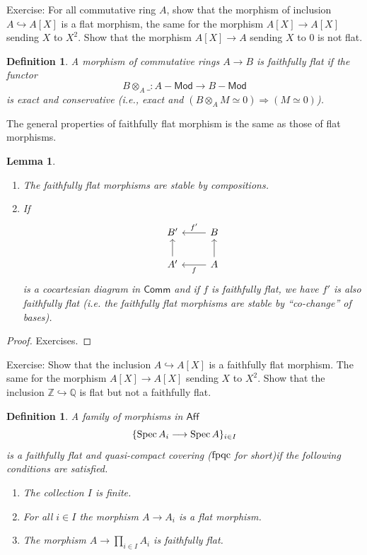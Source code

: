 \documentclass{tufte-book} %
\numberwithin{dummy}{section}
\newtheorem{lemma}[thm]{Lemma}
\newtheorem{dfn}[thm]{Definition}
\newcommand{\spec}{\textnormal{Spec}\,}
\newcommand{\intg}{\mathbb Z}
\newcommand{\ratl}{\mathbb Q}
\newcommand{\Lrta}{\Longrightarrow}
\newcommand{\lrta}{\longrightarrow}
\newcommand{\inj}{\hookrightarrow}
\begin{document}
Exercise: For all commutative ring $A$, show that the morphism of inclusion $A\inj A[X]$ is a flat morphism, the same for the morphism $A[X]\lrta A[X]$ sending $X$ to $X^2$. Show that the morphism $A[X]\lrta A$ sending $X$ to $0$ is not flat.
\begin{dfn}
A morphism of commutative rings $A\lrta B$ is faithfully flat if the functor 
$$B\otimes_A\_: A-\mathsf{Mod}\lrta B-\mathsf{Mod}
$$
is exact and conservative (i.e., exact and $(B\otimes_A M\simeq 0)\Lrta (M\simeq 0)$).
\end{dfn}
The general properties of faithfully flat  morphism is the same as those of flat morphisms.
\begin{lemma}\label{lem:property_faithfully_flat}
\ \begin{enumerate}
\item The faithfully flat morphisms are stable by compositions.
\item  If
$$
\begin{tikzcd}
B' & B \arrow[l, "f'"'] \\
A' \arrow[u] & A \arrow[l, "f"] \arrow[u]
\end{tikzcd}
$$ 
is a cocartesian diagram in $\mathsf{Comm}$ and if $f$ is faithfully flat, we have $f'$ is also faithfully flat (i.e. the faithfully flat morphisms are stable by ``co-change'' of bases).
\end{enumerate}
\end{lemma}
\begin{proof}
Exercises.
\end{proof}

Exercise: Show that the inclusion $A\inj A[X]$ is a faithfully flat morphism. The same for the morphism $A[X]\lrta A[X]$ sending $X$ to $X^2$. Show that the inclusion $\intg\inj \ratl$ is flat but not a faithfully flat.

\begin{dfn}
A family of morphisms in $\mathsf{Aff}$
$$
\{\spec A_i\lrta \spec A\}_{i\in I}
$$
is a faithfully flat and quasi-compact covering ($\textnormal{fpqc}$ for short)if  the following conditions are satisfied.
\begin{enumerate}
\item The collection $I$ is finite.
\item For all $i\in I$ the morphism $A\lrta A_i$ is a flat morphism.
\item The morphism $A\lrta \prod_{i\in I}A_i$ is faithfully  flat.
\end{enumerate}
\end{dfn}
\end{document}
